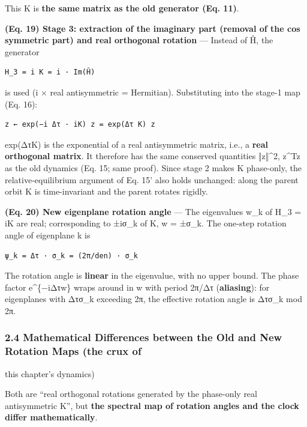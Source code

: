 \documentclass[
  a4paper,
]{ltjsarticle}
\begin{document}
This K is \textbf{the same matrix as the old generator (Eq. 11)}.

\textbf{(Eq. 19) Stage 3: extraction of the imaginary part (removal of
the cos symmetric part) and real orthogonal rotation} --- Instead of Ĥ,
the generator

\begin{verbatim}
H_3 = i K = i · Im(Ĥ)
\end{verbatim}

is used (i × real antisymmetric = Hermitian). Substituting into the
stage-1 map (Eq. 16):

\begin{verbatim}
z ← exp(−i Δτ · iK) z = exp(Δτ K) z
\end{verbatim}

exp(ΔτK) is the exponential of a real antisymmetric matrix, i.e., a
\textbf{real orthogonal matrix}. It therefore has the same conserved
quantities ‖z‖\^{}2, z\^{}Tz as the old dynamics (Eq. 15; same proof).
Since stage 2 makes K phase-only, the relative-equilibrium argument of
Eq. 15' also holds unchanged: along the parent orbit K is time-invariant
and the parent rotates rigidly.

\textbf{(Eq. 20) New eigenplane rotation angle} --- The eigenvalues w\_k
of H\_3 = iK are real; corresponding to ±iσ\_k of K, w = ±σ\_k. The
one-step rotation angle of eigenplane k is

\begin{verbatim}
ψ_k = Δτ · σ_k = (2π/den) · σ_k
\end{verbatim}

The rotation angle is \textbf{linear} in the eigenvalue, with no upper
bound. The phase factor e\^{}\{−iΔτw\} wraps around in w with period
2π/Δτ (\textbf{aliasing}): for eigenplanes with Δτσ\_k exceeding 2π, the
effective rotation angle is Δτσ\_k mod 2π.

\subsubsection{2.4 Mathematical Differences between the Old and New
Rotation Maps (the crux
of}\label{mathematical-differences-between-the-old-and-new-rotation-maps-the-crux-of}

this chapter's dynamics)

Both are ``real orthogonal rotations generated by the phase-only real
antisymmetric K'', but \textbf{the spectral map of rotation angles and
the clock differ mathematically}.
\end{document}
